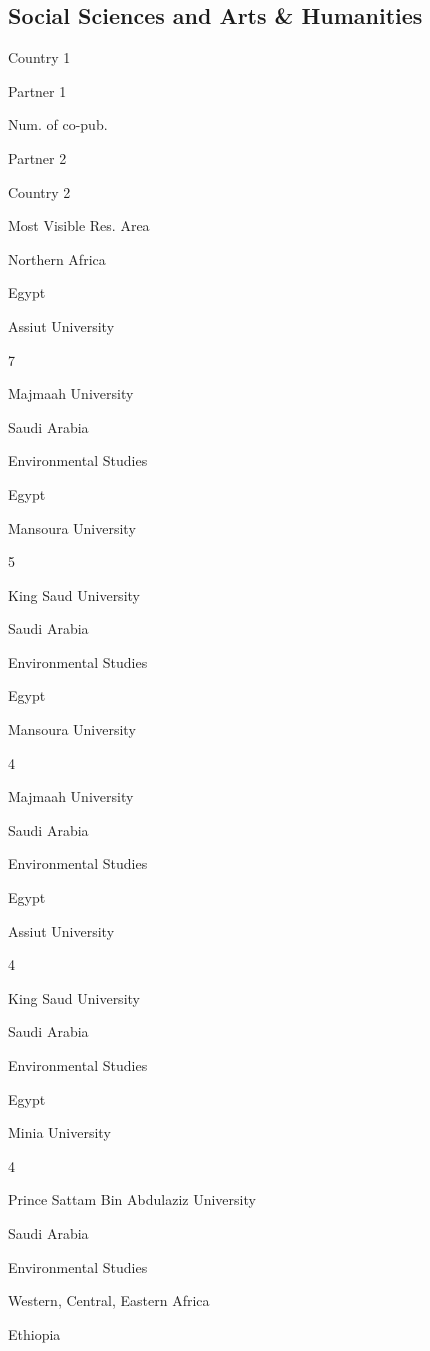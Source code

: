 \documentclass[
]{book}
\begin{document}
\hypertarget{social-sciences-and-arts-humanities}{%
\subsection{Social Sciences and Arts \& Humanities}\label{social-sciences-and-arts-humanities}}

Country 1

Partner 1

Num. of co-pub.

Partner 2

Country 2

Most Visible Res. Area

Northern Africa

{Egypt }

{Assiut University }

{7 }

{Majmaah University }

{Saudi Arabia }

{Environmental Studies }

{Egypt }

{Mansoura University }

{5 }

{King Saud University }

{Saudi Arabia }

{Environmental Studies }

{Egypt }

{Mansoura University }

{4 }

{Majmaah University }

{Saudi Arabia }

{Environmental Studies }

{Egypt }

{Assiut University }

{4 }

{King Saud University }

{Saudi Arabia }

{Environmental Studies }

{Egypt }

{Minia University }

{4 }

{Prince Sattam Bin Abdulaziz University}

{Saudi Arabia }

{Environmental Studies }

Western, Central, Eastern Africa

{Ethiopia }
\end{document}
